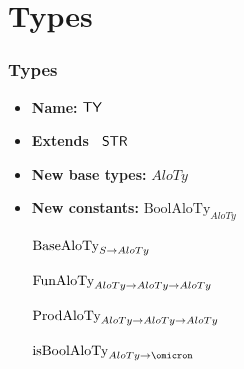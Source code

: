 \documentclass[xcolor={dvipsnames}]{beamer}
\begin{document}
\section{Types}
\begin{frame}
\frametitle{Types}
\begin{thyext}[Types]
\noindent
\begin{itemize} \setlength{\itemsep}{0pt}\vspace{-0.5cm}
\item[]\hspace{-3ex}\textbf{Name:} $\mathsf{TY}$
\item[]\hspace{-3ex}\textbf{Extends\ } $\mathsf{STR}$
\item[]\hspace{-3ex}\textbf{New base types:} $AloTy$
\item[]\hspace{-3ex}\textbf{New constants:}\newline
$\text{BoolAloTy}_{AloTy}$

$\text{BaseAloTy}_{{S} \rightarrow {AloTy}}$

$\text{FunAloTy}_{{AloTy} \rightarrow {{AloTy} \rightarrow {AloTy}}}$

$\text{ProdAloTy}_{{AloTy} \rightarrow {{AloTy} \rightarrow {AloTy}}}$

$\text{isBoolAloTy}_{\cFunTyX{AloTy}{\cB}}$
\end{itemize}
\end{thyext}
\end{frame}
\end{document}

